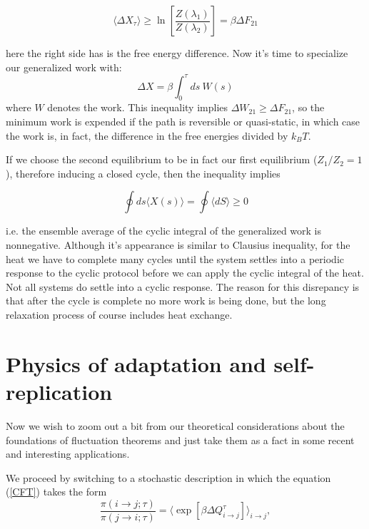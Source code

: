 \documentclass[a4paper,12pt]{article}
\begin{document}
\begin{equation}
  \langle \Delta X_\tau \rangle \geq \ln\left[\frac{Z(\lambda_1)}{Z(\lambda_2)}\right]=\beta \Delta F_{21}
\end{equation}

here the right side has is the free energy difference. Now it's time to specialize our generalized work with:
\begin{equation}
  \Delta X = \beta \int_0^\tau ds\ W(s)
\end{equation}
where $W$ denotes the work. This inequality implies $\Delta W_{21} \geq \Delta F_{21} $, so the minimum work is expended if the path is reversible or quasi-static, in which case the work is, in fact, the difference in the free energies divided by $k_B T$.

If we choose the second equilibrium to be in fact our first equilibrium ($Z_1/Z_2=1$), therefore inducing a closed cycle, then the inequality implies

\begin{equation}
\label{CyclicInequalityForGeneralizedWork}
  \oint ds \langle X(s) \rangle = \oint \langle dS \rangle \geq 0
\end{equation}

i.e. the ensemble average of the cyclic integral of the generalized work is nonnegative.
Although it's appearance is similar to Clausius inequality, for the heat we have to complete many cycles until the system settles into a periodic response to the cyclic protocol before we can apply the cyclic integral of the heat. Not all systems do settle into a cyclic response. The reason for this disrepancy is that after the cycle is complete no more work is being done, but the long relaxation process of course includes heat exchange. 

\section{Physics of adaptation and self-replication}

Now we wish to zoom out a bit from our theoretical considerations about the foundations of fluctuation theorems and just take them as a fact in some recent and interesting applications\cite{Perunov:2016hl}\cite{England:2013ed}.

We proceed by switching to a stochastic description in which the equation (\ref{CFT}) takes the form
\begin{equation}
\label{MicroscopicIrreversibility}
\frac{\pi (i\to j;\tau )}{\pi (j\to i;\tau )}= \langle \exp[\beta  \Delta Q_{i\to j}^{\tau}] \rangle_{i \to j},
\end{equation}
\end{document}
